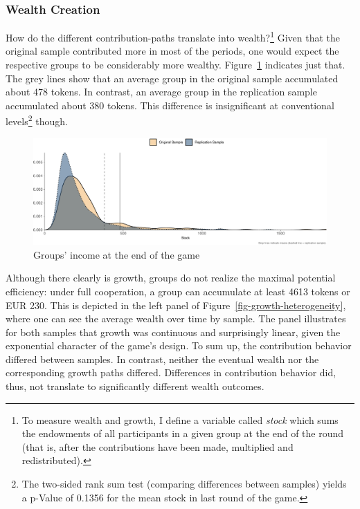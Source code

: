 \documentclass[
  authoryear,
  preprint,
  3p]{elsarticle}
\begin{document}
\hypertarget{sec-wealth}{%
\subsubsection{Wealth Creation}\label{sec-wealth}}

How do the different contribution-paths translate into
wealth?\footnote{To measure wealth and growth, I define a variable
  called \emph{stock} which sums the endowments of all participants in a
  given group at the end of the round (that is, after the contributions
  have been made, multiplied and redistributed).} Given that the
original sample contributed more in most of the periods, one would
expect the respective groups to be considerably more wealthy.
Figure~\ref{fig-stock-distribution} indicates just that. The grey lines
show that an average group in the original sample accumulated about 478
tokens. In contrast, an average group in the replication sample
accumulated about 380 tokens. This difference is insignificant at
conventional levels\footnote{The two-sided rank sum test (comparing
  differences between samples) yields a p-Value of 0.1356 for the mean
  stock in last round of the game.} though.

\begin{figure}

{\centering \includegraphics{paper_files/figure-pdf/fig-stock-distribution-1.pdf}

}

\caption{\label{fig-stock-distribution}Groups' income at the end of the
game}

\end{figure}

Although there clearly is growth, groups do not realize the maximal
potential efficiency: under full cooperation, a group can accumulate at
least 4613 tokens or EUR 230. This is depicted in the left panel of
Figure~\ref{fig-growth-heterogeneity}, where one can see the average
wealth over time by sample. The panel illustrates for both samples that
growth was continuous and surprisingly linear, given the exponential
character of the game's design. To sum up, the contribution behavior
differed between samples. In contrast, neither the eventual wealth nor
the corresponding growth paths differed. Differences in contribution
behavior did, thus, not translate to significantly different wealth
outcomes.
\end{document}
